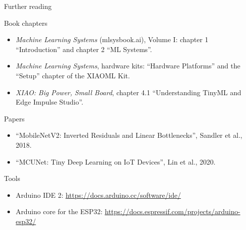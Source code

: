 \begin{frame}{Further reading}
  \footnotesize
  \begin{block}{Book chapters}
    \begin{itemize}
      \item \emph{Machine Learning Systems} (mlsysbook.ai), Volume I:
            chapter 1 ``Introduction'' and chapter 2 ``ML Systems''.
      \item \emph{Machine Learning Systems}, hardware kits: ``Hardware
            Platforms'' and the ``Setup'' chapter of the XIAOML Kit.
      \item \emph{XIAO: Big Power, Small Board}, chapter 4.1
            ``Understanding TinyML and Edge Impulse Studio''.
    \end{itemize}
  \end{block}
  \begin{block}{Papers}
    \begin{itemize}
      \item ``MobileNetV2: Inverted Residuals and Linear Bottlenecks'',
            Sandler et al., 2018.
      \item ``MCUNet: Tiny Deep Learning on IoT Devices'', Lin et al., 2020.
    \end{itemize}
  \end{block}
  \begin{block}{Tools}
    \begin{itemize}
      \item Arduino IDE 2: \url{https://docs.arduino.cc/software/ide/}
      \item Arduino core for the ESP32:
            \url{https://docs.espressif.com/projects/arduino-esp32/}
    \end{itemize}
  \end{block}
\end{frame}
